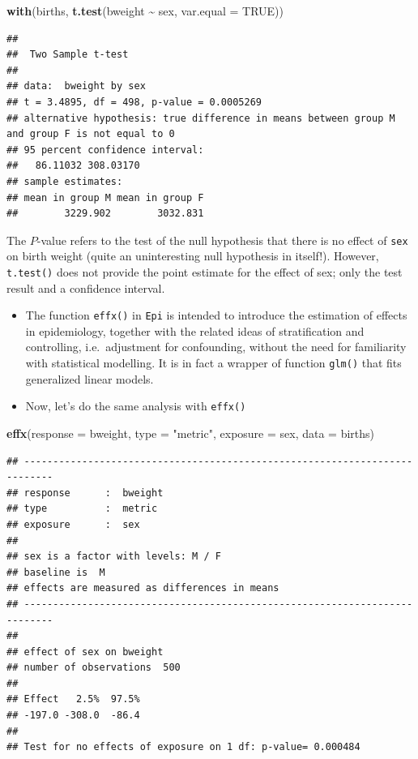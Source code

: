 \documentclass[
]{book}
\newenvironment{Shaded}{\begin{snugshade}}{\end{snugshade}}
\newcommand{\AttributeTok}[1]{\textcolor[rgb]{0.13,0.29,0.53}{#1}}
\newcommand{\ConstantTok}[1]{\textcolor[rgb]{0.56,0.35,0.01}{#1}}
\newcommand{\FunctionTok}[1]{\textcolor[rgb]{0.13,0.29,0.53}{\textbf{#1}}}
\newcommand{\NormalTok}[1]{#1}
\newcommand{\SpecialCharTok}[1]{\textcolor[rgb]{0.81,0.36,0.00}{\textbf{#1}}}
\newcommand{\StringTok}[1]{\textcolor[rgb]{0.31,0.60,0.02}{#1}}
\begin{document}
\begin{Shaded}
\begin{Highlighting}[]
\FunctionTok{with}\NormalTok{(births, }\FunctionTok{t.test}\NormalTok{(bweight }\SpecialCharTok{\textasciitilde{}}\NormalTok{ sex, }\AttributeTok{var.equal =} \ConstantTok{TRUE}\NormalTok{))}
\end{Highlighting}
\end{Shaded}

\begin{verbatim}
## 
##  Two Sample t-test
## 
## data:  bweight by sex
## t = 3.4895, df = 498, p-value = 0.0005269
## alternative hypothesis: true difference in means between group M and group F is not equal to 0
## 95 percent confidence interval:
##   86.11032 308.03170
## sample estimates:
## mean in group M mean in group F 
##        3229.902        3032.831
\end{verbatim}

The \(P\)-value refers to the test
of the null hypothesis that there is no effect of \texttt{sex} on birth weight
(quite an uninteresting null hypothesis in itself!). However, \texttt{t.test()} does not provide
the point estimate for the effect of sex; only the test result and a confidence interval.

\begin{itemize}
\item
  The function \texttt{effx()} in \texttt{Epi}
  is intended to introduce the estimation of effects in epidemiology, together with the related ideas of stratification and controlling, i.e.~adjustment for confounding,
  without the need for familiarity with statistical modelling.
  It is in fact a wrapper of function \texttt{glm()} that fits generalized linear models.
\item
  Now, let's do the same analysis with \texttt{effx()}
\end{itemize}

\begin{Shaded}
\begin{Highlighting}[]
\FunctionTok{effx}\NormalTok{(}\AttributeTok{response =}\NormalTok{ bweight, }\AttributeTok{type =} \StringTok{"metric"}\NormalTok{, }\AttributeTok{exposure =}\NormalTok{ sex, }\AttributeTok{data =}\NormalTok{ births)}
\end{Highlighting}
\end{Shaded}

\begin{verbatim}
## --------------------------------------------------------------------------- 
## response      :  bweight 
## type          :  metric 
## exposure      :  sex 
## 
## sex is a factor with levels: M / F 
## baseline is  M 
## effects are measured as differences in means 
## --------------------------------------------------------------------------- 
## 
## effect of sex on bweight 
## number of observations  500 
## 
## Effect   2.5%  97.5% 
## -197.0 -308.0  -86.4 
## 
## Test for no effects of exposure on 1 df: p-value= 0.000484
\end{verbatim}
\end{document}
